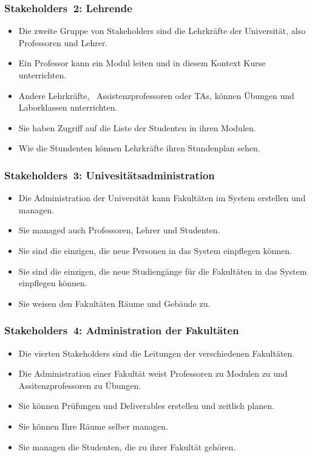 \documentclass[aspectratio=169,mathserif,notheorems]{beamer}%
\begin{document}
\begin{frame}%
\frametitle{Stakeholders~2: Lehrende}%
\begin{itemize}%
\item Die zweite Gruppe von Stakeholders sind die Lehrkräfte der Universität, also Professoren und Lehrer.%
%
\item<2-> Ein Professor kann ein Modul leiten und in diesem Kontext Kurse unterrichten.%
%
\item<3-> Andere Lehrkräfte, \DEzB\ Assistenzprofessoren oder TAs, können Übungen und Laborklassen unterrichten.%
%
\item<4-> Sie haben Zugriff auf die Liste der Studenten in ihren Modulen.%
%
\item<5-> Wie die Stundenten können Lehrkräfte ihren Stundenplan sehen.%
\end{itemize}%
\end{frame}%
%
\begin{frame}%
\frametitle{Stakeholders~3: Univesitätsadministration}%
\begin{itemize}%
\item Die Administration der Universität kann Fakultäten im System erstellen und managen.%
\item<2-> Sie managed auch Professoren, Lehrer und Studenten.%
\item<3-> Sie sind die einzigen, die neue Personen in das System einpflegen können.%
\item<4-> Sie sind die einzigen, die neue Studiengänge für die Fakultäten in das System einpflegen können.%
\item<5-> Sie weisen den Fakultäten Räume und Gebäude zu.%
\end{itemize}%
\end{frame}%
%
\begin{frame}%
\frametitle{Stakeholders~4: Administration der Fakultäten}%
\begin{itemize}%
%
\item Die vierten Stakeholders sind die Leitungen der verschiedenen Fakultäten.%
%
\item<2-> Die Administration einer Fakultät weist Professoren zu Modulen zu und Assitenzprofessoren zu Übungen.%
%
\item<3-> Sie können Prüfungen und Deliverables erstellen und zeitlich planen.%
%
\item<4-> Sie können Ihre Räume selber managen.%
%
\item<5-> Sie managen die Studenten, die zu ihrer Fakultät gehören.%
%
\end{itemize}%
\end{frame}%
\end{document}
